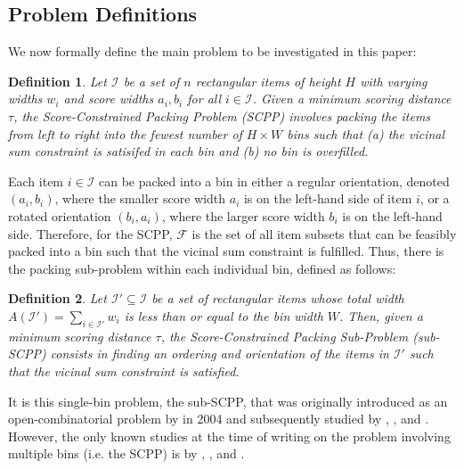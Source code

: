 \documentclass[a4paper,11pt,authoryear]{elsarticle}
\newcommand{\rev}[1]{{\color{myRed}#1}}
\newtheorem{definition}{Definition}
\begin{document}
\subsection{Problem Definitions}
\label{sub:intro}

\noindent We now formally define the main problem to be investigated in this paper:

\begin{definition}
	Let $\mathcal{I}$ be a set of $n$ rectangular items of height $H$ with varying widths $w_i$ and score widths $a_i, b_i$ for all $i \in \mathcal{I}$. Given a minimum scoring distance $\tau$, the \emph{Score-Constrained Packing Problem (SCPP)} involves packing the items from left to right into the fewest number of $H \times W$ bins such that (a) the vicinal sum constraint is satisifed in each bin and (b) no bin is overfilled.
	\label{defn:scpp}
\end{definition}	

\noindent Each item $i \in \mathcal{I}$ can be packed into a bin in either a regular orientation, denoted $(a_i, b_i)$, where the smaller score width $a_i$ is on the left-hand side of item $i$, or a rotated orientation $(b_i, a_i)$, where the larger score width $b_i$ is on the left-hand side. Therefore, for the SCPP, $\mathcal{F}$ is the set of all item subsets that can be feasibly packed into a bin such that the vicinal sum constraint is fulfilled. Thus, there is the packing sub-problem within each individual bin, defined as follows:

\begin{definition}
	Let $\mathcal{I}' \subseteq \mathcal{I}$ be a set of rectangular items whose total width $A(\mathcal{I}') = \sum_{i \in \mathcal{I}'} w_i$ is less than or equal to the bin width $W$. Then, given a minimum scoring distance $\tau$, the \emph{Score-Constrained Packing Sub-Problem (sub-SCPP)} \rev{consists in} finding an ordering and orientation of the items in $\mathcal{I}'$ such that the vicinal sum constraint is satisfied.
	\label{defn:subscp}
\end{definition}

\noindent It is this single-bin problem, the sub-SCPP, that was originally introduced as an open-combinatorial problem by \citeauthor{goulimis2004} in 2004 and subsequently studied by \cite{becker2010}, \cite{lewis2011}, and \cite{becker2015}. However, the only known studies at the time of writing on the problem involving multiple bins (i.e. the SCPP) is by \citet{lewis2011}, \cite{hawa2018}, and \citet{hawa2020t}.
\end{document}
